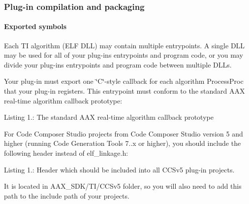 \hypertarget{a00832_subsection__plugin_compilation_and_packaging}{}\subsubsection{Plug-\/in compilation and packaging}\label{a00832_subsection__plugin_compilation_and_packaging}
 \hypertarget{a00832_subsubsection__exported_symbols_}{}\paragraph{Exported symbols}\label{a00832_subsubsection__exported_symbols_}
 Each TI algorithm (E\+LF D\+LL) may contain multiple entrypoints. A single D\+LL may be used for all of your plug-\/in\textquotesingle{}s entrypoints and program code, or you may divide your plug-\/in\textquotesingle{}s entrypoints and program code between multiple D\+L\+Ls.

Your plug-\/in must export one \char`\"{}\+C\char`\"{}-\/style callback for each algorithm Process\+Proc that your plug-\/in registers. This entrypoint must conform to the standard A\+AX real-\/time algorithm callback prototype\+:


\begin{DoxyCode}{0}
\DoxyCodeLine{\textcolor{preprocessor}{\# include "elf\_linkage.h"} \textcolor{comment}{// Includes required TI\_EXPORT definition}}
\DoxyCodeLine{\textcolor{keyword}{extern} \textcolor{stringliteral}{"C"}}
\DoxyCodeLine{\textcolor{keywordtype}{void}}
\end{DoxyCode}
  Listing 1.\+: The standard A\+AX real-\/time algorithm callback prototype

For Code Composer Studio projects from Code Composer Studio version 5 and higher (running Code Generation Tools 7..\+x or higher), you should include the following header instead of elf\+\_\+linkage.\+h\+:


\begin{DoxyCode}{0}
\DoxyCodeLine{\textcolor{preprocessor}{\# include "elf\_linkage\_aax\_ccsv5.h"}}
\end{DoxyCode}
  Listing 1.\+: Header which should be included into all C\+C\+Sv5 plug-\/in projects.

It is located in A\+A\+X\+\_\+\+S\+D\+K/\+T\+I/\+C\+C\+Sv5 folder, so you will also need to add this path to the include path of your projects.

